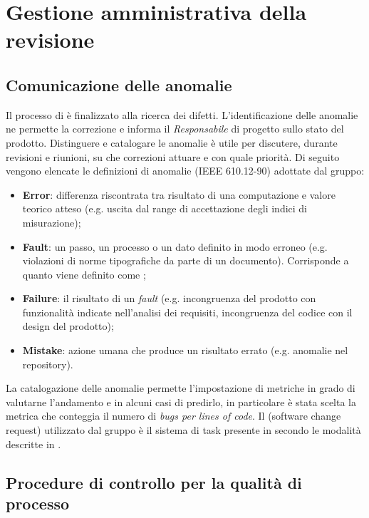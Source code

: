 \section{Gestione amministrativa della revisione}

	\subsection{Comunicazione delle anomalie}
	\label{DefinizioneAnomalie}

	Il processo di  è finalizzato alla ricerca dei difetti. L'identificazione delle anomalie ne permette la correzione e informa il \emph{Responsabile} di progetto sullo stato del prodotto. Distinguere e catalogare le anomalie è utile per discutere, durante revisioni e riunioni, su che correzioni attuare e con quale priorità. Di seguito vengono elencate le definizioni di anomalie (IEEE 610.12-90) adottate dal gruppo:
	\begin{itemize}
		\item \textbf{Error}: differenza riscontrata tra risultato di una computazione e valore teorico atteso (e.g. uscita dal range di accettazione degli indici di misurazione);
		\item \textbf{Fault}: un passo, un processo o un dato definito in modo erroneo (e.g. violazioni di norme tipografiche da parte di un documento). Corrisponde a quanto viene definito come ;
		\item \textbf{Failure}: il risultato di un \emph{fault} (e.g. incongruenza del prodotto con funzionalità indicate nell'analisi dei requisiti, incongruenza del codice con il design del prodotto);
		\item \textbf{Mistake}: azione umana che produce un risultato errato (e.g. anomalie nel repository).
	\end{itemize}
	La catalogazione delle anomalie permette l'impostazione di metriche in grado di valutarne l'andamento e in alcuni casi di predirlo, in particolare è stata scelta la metrica che conteggia il numero di \emph{bugs per lines of code}. Il  (software change request) utilizzato dal gruppo è il sistema di task presente in   secondo le modalità descritte in \NormeDiProgetto.


	\subsection{Procedure di controllo per la qualità di processo}

